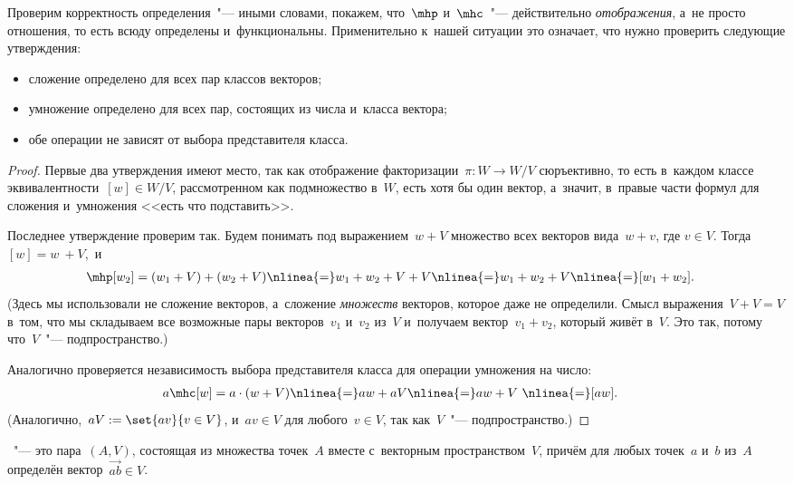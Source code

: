 	Проверим корректность определения~"--- иными словами, покажем, что~$\mhp$
	и~$\mhc$~"--- действительно \emph{отображения}, а~не просто отношения, то
	есть всюду определены и~функциональны. Применительно к~нашей ситуации это
	означает, что нужно проверить следующие утверждения:
	\begin{itemize}
		\item сложение определено для всех пар классов векторов;
		\item умножение определено для всех пар, состоящих из числа и~класса
			вектора;
		\item обе операции не зависят от выбора представителя класса.
	\end{itemize}%

	\begin{proof}
		Первые два утверждения имеют место, так как отображение
		факторизации~$\pi \colon W \to W/V$ сюръективно, то есть в~каждом
		классе эквивалентности~$[w] \in W/V$, рассмотренном как подмножество
		в~$W$, есть хотя бы один вектор, а~значит, в~правые части формул для
		сложения и~умножения <<есть что подставить>>.

		Последнее утверждение проверим так. Будем понимать под выражением~$w +
		V$ множество всех векторов вида~$w + v$, где $v \in V$. Тогда $[w] =
		w~+ V$,~и
		\begin{align*}
			[w_1] \mhp [w_2] &=
			(w_1 + V) + (w_2 + V) 
			\nlinea{=}
			w_1 + w_2 + V + V 
			\nlinea{=}
			w_1 + w_2 + V 
			\nlinea{=}
			[w_1 + w_2]
			.
		\end{align*}
		(Здесь мы использовали не сложение векторов, а~сложение \emph{множеств}
		векторов, которое даже не определили. Смысл выражения~$V + V = V$
		в~том, что мы складываем все возможные пары векторов~$v_1$ и~$v_2$
		из~$V$ и~получаем вектор~$v_1 + v_2$, который живёт в~$V$. Это так,
		потому что~$V$~"--- подпространство.)

		Аналогично проверяется независимость выбора представителя класса для
		операции умножения на число:
		\begin{align*}
			a \mhc [w] &=
			a \cdot (w + V)
			\nlinea{=}
			aw + aV
			\nlinea{=}
			aw + V~\nlinea{=}
			[aw]
			.
		\end{align*}
		(Аналогично,~$aV := \set{av}{v \in V}$, и~$av \in V$ для любого~$v \in
		V$, так как~$V$~"--- подпространство.)%
	\end{proof}


	\begin{definition}
		~"--- это пара~$(A, V)$, состоящая из
		множества точек~$A$ вместе с~векторным пространством~$V$, причём для
		любых точек~$a$ и~$b$ из~$A$ определён вектор~$\vec{ab} \in V$.
		\label{<+label+>}
	\end{definition}

